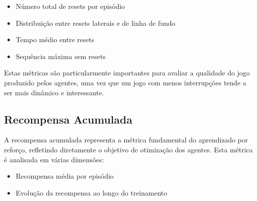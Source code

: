 \begin{itemize}
    \item Número total de resets por episódio
    \item Distribuição entre resets laterais e de linha de fundo
    \item Tempo médio entre resets
    \item Sequência máxima sem resets
\end{itemize}

Estas métricas são particularmente importantes para avaliar a qualidade do jogo produzido pelos agentes, uma vez que um jogo com menos interrupções tende a ser mais dinâmico e interessante.





\subsection{Recompensa Acumulada}

A recompensa acumulada representa a métrica fundamental do aprendizado por reforço, refletindo diretamente o objetivo de otimização dos agentes. Esta métrica é analisada em várias dimensões:

\begin{itemize}
    \item Recompensa média por episódio
    \item Evolução da recompensa ao longo do treinamento
\end{itemize}


